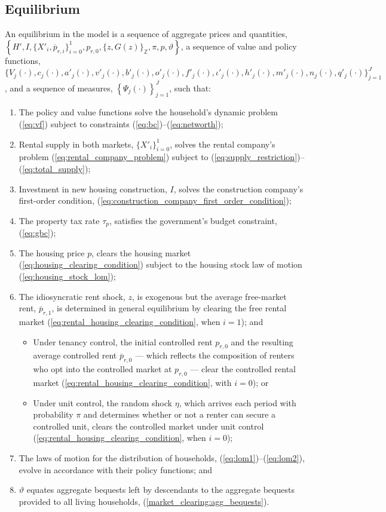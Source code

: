 \documentclass[parskip=full]{article}
\begin{document}
\subsection{Equilibrium}
An equilibrium in the model is a sequence of aggregate prices and quantities, $\left\{H',I,\{X'_{i},\overline{p}_{r,i}\}^{1}_{i=0},p_{r,0},\{z,G(z)\}_\mathbb{Z},\pi,p,\vartheta\right\}$, a sequence of value and policy functions, $\biggl\{V_{j}(\cdot),c_{j}(\cdot),a'_{j}(\cdot),v'_{j}(\cdot),b'_{j}(\cdot),o'_{j}(\cdot),f'_{j}(\cdot),\iota'_{j}(\cdot),h'_{j}(\cdot),m'_{j}(\cdot),n_{j}(\cdot),q'_{j}(\cdot)\biggl\}_{j=1}^J$, and a sequence of measures, $\left\{\Psi_{j}(\cdot)\right\}_{j=1}^J$, such that:
\begin{enumerate}
\item The policy and value functions solve the household's dynamic problem (\ref{eq:vf}) subject to constraints (\ref{eq:bc})--(\ref{eq:networth});
\item Rental supply in both markets, $\{X'_{i}\}^{1}_{i=0}$, solves the rental company's problem (\ref{eq:rental_company_problem}) subject to (\ref{eq:supply_restriction})--(\ref{eq:total_supply});
\item Investment in new housing construction, $I$, solves the construction company's first-order condition, (\ref{eq:construction_company_first_order_condition});
\item The property tax rate $\tau_p$, satisfies the government's budget constraint, (\ref{eq:gbc});
\item The housing price $p$, clears the housing market
(\ref{eq:housing_clearing_condition}) subject to the housing stock law of motion (\ref{eq:housing_stock_lom});
\item The idiosyncratic rent shock, $z$, is exogenous but the average free-market rent, $\overline{p}_{r,1}$, is determined in general equilibrium by clearing the free rental market (\ref{eq:rental_housing_clearing_condition}, when $i=1$); and
\begin{itemize}
    \item Under tenancy control, the initial controlled rent $p_{r,0}$ and the resulting average controlled rent $\overline{p}_{r,0}$ — which reflects the composition of renters who opt into the controlled market at $p_{r,0}$ — clear the controlled rental market (\ref{eq:rental_housing_clearing_condition}, with $i=0$); or
    \item Under unit control, the random shock $\eta$, which arrives each period with probability $\pi$ and determines whether or not a renter can secure a controlled unit, clears the controlled market under unit control (\ref{eq:rental_housing_clearing_condition}, when $i=0$);
\end{itemize}
\item The laws of motion for the distribution of households, (\ref{eq:lom1})--(\ref{eq:lom2}), evolve in accordance with their policy functions; and
\item $\vartheta$ equates aggregate bequests left by descendants to the aggregate bequests provided to all living households, (\ref{market_clearing:agg_bequests}).
\end{enumerate}
\end{document}
